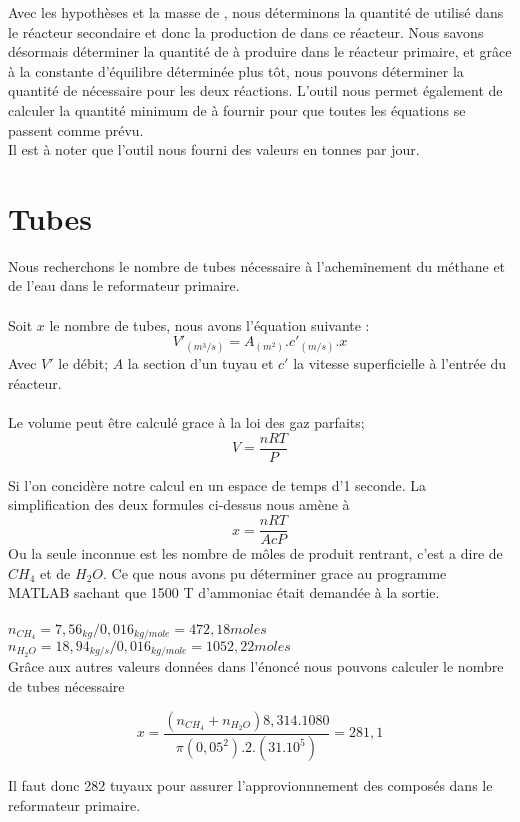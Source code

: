\documentclass[a4paper, oneside, 12pt]{article}
\begin{document}
Avec les hypothèses et la masse de , nous déterminons la quantité de  
utilisé dans le réacteur secondaire et donc la production de  dans ce réacteur. Nous savons désormais 
déterminer la quantité de  à produire dans le réacteur primaire, et grâce à la constante d'équilibre déterminée 
plus tôt, nous pouvons déterminer la quantité de  nécessaire pour les deux réactions. L'outil nous permet également
de calculer la quantité minimum de  à fournir pour que toutes les équations se passent comme prévu. 
\\

Il est à noter que l'outil nous fourni des valeurs en tonnes par jour.

\section*{Tubes}
Nous recherchons le nombre de tubes nécessaire à l'acheminement du méthane et de l'eau dans le reformateur primaire.\\
\\
Soit $x$ le nombre de tubes, nous avons l'équation suivante :
\[
V'_{(m^3/s)} = A_{(m^2)}. c'_{(m/s)} .x
\]
Avec $V'$ le débit; $A$ la section d'un tuyau et $c'$ la vitesse superficielle à l'entrée du réacteur.\\
\\
Le volume peut être calculé grace à la loi des gaz parfaits;
\[
V=\frac{nRT}{P}
\]

Si l'on concidère notre calcul en un espace de temps d'1 seconde. La simplification des deux formules ci-dessus nous amène à
\[
x=\frac{nRT}{AcP}
\]
Ou la seule inconnue est les nombre de môles de produit rentrant, c'est a dire de $CH_{4}$ et de $H_{2}O$. Ce que nous avons pu déterminer grace au programme MATLAB sachant que 1500 T d'ammoniac était demandée à la sortie.\\
\\
$n_{CH_{4}}= 7,56_{kg} / 0,016_{kg/mole} = 472,18 moles$\\
$n_{H_{2}O}= 18,94_{kg/s}/ 0,016_{kg/mole} = 1052,22 moles$\\

Grâce aux autres valeurs données dans l'énoncé nous pouvons calculer le nombre de tubes nécessaire 


\[
x=\frac{(n_{CH_{4}}+n_{H_{2}O})8,314.1080}{\pi(0,05^2).2.(31.10^5)}=281,1
\]

Il faut donc 282 tuyaux pour assurer l'approvionnnement des composés dans le reformateur primaire.
\end{document}
